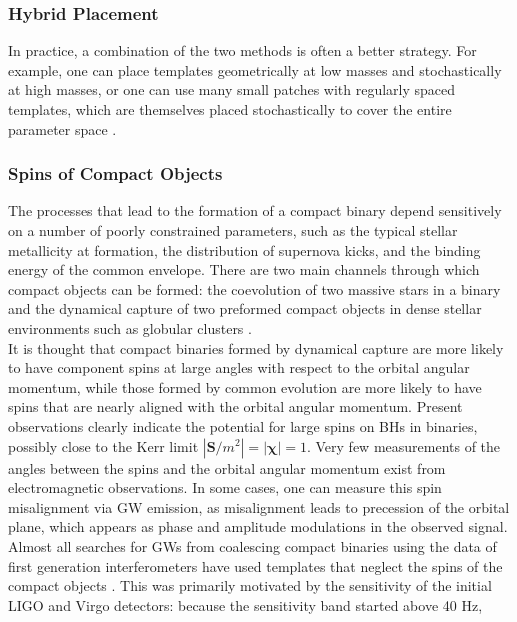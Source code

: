 \documentclass[binding=0.6cm, LaM]{sapthesis}
\begin{document}
\subsubsection{Hybrid Placement}

	In practice, a combination of the two methods is often a better strategy. 
	For example, one can place templates geometrically at low masses 
	and stochastically at high masses, or one can use many small patches 
	with regularly spaced templates, which are themselves placed stochastically 
	to cover the entire parameter space \cite{29, 34}. 

\subsubsection{Spins of Compact Objects}

	The processes that lead to the formation of a compact binary
	depend sensitively on a number of poorly constrained parameters, 
	such as the typical stellar metallicity at formation, 
	the distribution of supernova kicks, 
	and the binding energy of the common envelope. 
	There are two main channels through which compact objects can be formed:
	the coevolution of two massive stars in a binary and 
	the dynamical capture of two preformed compact objects 
	in dense stellar environments such as globular clusters \cite{37}. \\	
	It is thought that compact binaries formed by dynamical capture 
	are more likely to have component spins
	at large angles with respect to the orbital angular momentum, 
	while those formed by common evolution are more likely to have 
	spins that are nearly aligned with the orbital angular momentum.
	Present observations clearly indicate the potential for large spins 
	on BHs in binaries, possibly close to the Kerr limit $|\mathbf{S}/m^2| = |\mathbf{\chi}| = 1$.
	Very few measurements of the angles between the spins and 
	the orbital angular momentum exist from electromagnetic observations. 
	In some cases, one can measure this spin misalignment via GW emission, 
	as misalignment leads to precession of the orbital plane, 
	which appears as phase and amplitude modulations in the observed signal. \\
	Almost all searches for GWs from coalescing compact binaries 
	using the data of first generation interferometers 
	have used templates that neglect the spins of the compact objects \cite{32}.
	This was primarily motivated by the sensitivity of the initial LIGO and Virgo detectors:
	because the sensitivity band started above 40 Hz, 
\end{document}
